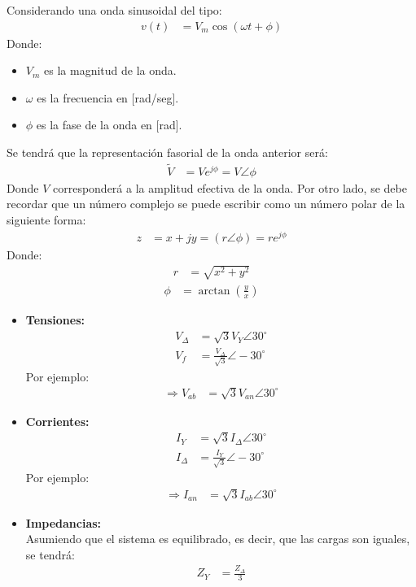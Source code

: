\documentclass[
  11pt,
  letterpaper,
   addpoints,
   answers
  ]{exam}
\begin{document}
Considerando una onda sinusoidal del tipo:
\begin{align}
v(t) &= V_m \cos(\omega t + \phi)
\end{align}
Donde:
\begin{itemize}
    \item $V_m$ es la magnitud de la onda.
    \item $\omega$ es la frecuencia en [rad/seg].
    \item $\phi$ es la fase de la onda en [rad].
\end{itemize}
Se tendrá que la representación fasorial de la onda anterior será:
\begin{align}
\tilde{V} &= V e^{j\phi} = V \angle \phi
\end{align}
Donde $V$ corresponderá a la amplitud efectiva de la onda. Por otro lado, se debe recordar que un número complejo se puede escribir como un número polar de la siguiente forma:
\begin{align}
z &= x + jy = (r \angle \phi) = r e^{j\phi}
\end{align}
Donde:
\begin{align}
r &= \sqrt{x^2 + y^2}
\end{align}
\begin{align}
\phi &= \arctan\left(\frac{y}{x}\right)
\end{align}
\begin{itemize}
    \item \textbf{Tensiones:}
    \begin{align}
        V_{\Delta} &= \sqrt{3} V_Y \angle 30^\circ \\
        V_f &= \frac{V_{\Delta}}{\sqrt{3}} \angle -30^\circ
    \end{align}
    Por ejemplo:
    \begin{align}
        \Rightarrow V_{ab} &= \sqrt{3} V_{an} \angle 30^\circ
    \end{align}
    
    \item \textbf{Corrientes:}
    \begin{align}
        I_Y &= \sqrt{3} I_{\Delta} \angle 30^\circ \\
        I_{\Delta} &= \frac{I_Y}{\sqrt{3}} \angle -30^\circ
    \end{align}
    Por ejemplo:
    \begin{align}
        \Rightarrow I_{an} &= \sqrt{3} I_{ab} \angle 30^\circ
    \end{align}
    
    \item \textbf{Impedancias:} \\
    Asumiendo que el sistema es equilibrado, es decir, que las cargas son iguales, se tendrá:
    \begin{align}
        Z_Y &= \frac{Z_{\Delta}}{3}
    \end{align}
\end{itemize}
\end{document}
